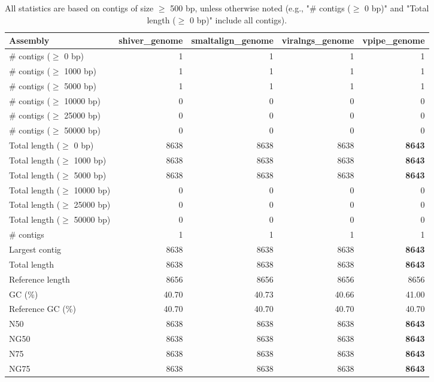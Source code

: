\documentclass[12pt,a4paper]{article}
\begin{document}
\begin{table}[ht]
\begin{center}
\caption{All statistics are based on contigs of size $\geq$ 500 bp, unless otherwise noted (e.g., "\# contigs ($\geq$ 0 bp)" and "Total length ($\geq$ 0 bp)" include all contigs).}
\begin{tabular}{|l*{4}{|r}|}
\hline
Assembly & shiver\_genome & smaltalign\_genome & viralngs\_genome & vpipe\_genome \\ \hline
\# contigs ($\geq$ 0 bp) & 1 & 1 & 1 & 1 \\ \hline
\# contigs ($\geq$ 1000 bp) & 1 & 1 & 1 & 1 \\ \hline
\# contigs ($\geq$ 5000 bp) & 1 & 1 & 1 & 1 \\ \hline
\# contigs ($\geq$ 10000 bp) & 0 & 0 & 0 & 0 \\ \hline
\# contigs ($\geq$ 25000 bp) & 0 & 0 & 0 & 0 \\ \hline
\# contigs ($\geq$ 50000 bp) & 0 & 0 & 0 & 0 \\ \hline
Total length ($\geq$ 0 bp) & 8638 & 8638 & 8638 & {\bf 8643} \\ \hline
Total length ($\geq$ 1000 bp) & 8638 & 8638 & 8638 & {\bf 8643} \\ \hline
Total length ($\geq$ 5000 bp) & 8638 & 8638 & 8638 & {\bf 8643} \\ \hline
Total length ($\geq$ 10000 bp) & 0 & 0 & 0 & 0 \\ \hline
Total length ($\geq$ 25000 bp) & 0 & 0 & 0 & 0 \\ \hline
Total length ($\geq$ 50000 bp) & 0 & 0 & 0 & 0 \\ \hline
\# contigs & 1 & 1 & 1 & 1 \\ \hline
Largest contig & 8638 & 8638 & 8638 & {\bf 8643} \\ \hline
Total length & 8638 & 8638 & 8638 & {\bf 8643} \\ \hline
Reference length & 8656 & 8656 & 8656 & 8656 \\ \hline
GC (\%) & 40.70 & 40.73 & 40.66 & 41.00 \\ \hline
Reference GC (\%) & 40.70 & 40.70 & 40.70 & 40.70 \\ \hline
N50 & 8638 & 8638 & 8638 & {\bf 8643} \\ \hline
NG50 & 8638 & 8638 & 8638 & {\bf 8643} \\ \hline
N75 & 8638 & 8638 & 8638 & {\bf 8643} \\ \hline
NG75 & 8638 & 8638 & 8638 & {\bf 8643} \\ \hline

\end{tabular}
\end{center}
\end{table}
\end{document}
